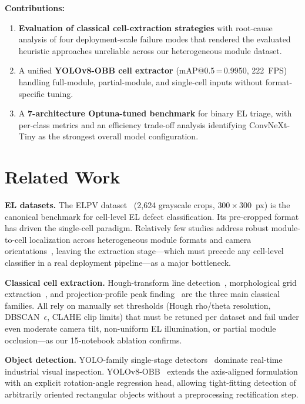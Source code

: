 \documentclass[conference]{IEEEtran}
\begin{document}
\textbf{Contributions:}
\begin{enumerate}
  \item \textbf{Evaluation of classical cell-extraction strategies} with root-cause analysis of four deployment-scale failure modes that rendered the evaluated heuristic approaches unreliable across our heterogeneous module dataset.
  \item A unified \textbf{YOLOv8-OBB cell extractor} (mAP@0.5\,=\,0.9950, 222~FPS) handling full-module, partial-module, and single-cell inputs without format-specific tuning.
  \item A \textbf{7-architecture Optuna-tuned benchmark} for binary EL triage, with per-class metrics and an efficiency trade-off analysis identifying ConvNeXt-Tiny as the strongest overall model configuration.
\end{enumerate}

\section{Related Work}
\label{sec:related}

\textbf{EL datasets.} The ELPV dataset~\cite{deitsch2019} (2{,}624 grayscale crops, $300\times300$~px) is the canonical benchmark for cell-level EL defect classification. Its pre-cropped format has driven the single-cell paradigm. Relatively few studies address robust module-to-cell localization across heterogeneous module formats and camera orientations~\cite{zhao2022, su2021, li2023, chen2024, wang2023}, leaving the extraction stage---which must precede any cell-level classifier in a real deployment pipeline---as a major bottleneck.

\textbf{Classical cell extraction.} Hough-transform line detection~\cite{duda1972}, morphological grid extraction~\cite{soille2003}, and projection-profile peak finding~\cite{wong1982} are the three main classical families. All rely on manually set thresholds (Hough rho/theta resolution, DBSCAN~$\epsilon$, CLAHE clip limits) that must be retuned per dataset and fail under even moderate camera tilt, non-uniform EL illumination, or partial module occlusion---as our 15-notebook ablation confirms.

\textbf{Object detection.} YOLO-family single-stage detectors~\cite{redmon2016,jocher2023} dominate real-time industrial visual inspection. YOLOv8-OBB~\cite{jocher2023} extends the axis-aligned formulation with an explicit rotation-angle regression head, allowing tight-fitting detection of arbitrarily oriented rectangular objects without a preprocessing rectification step.
\end{document}

